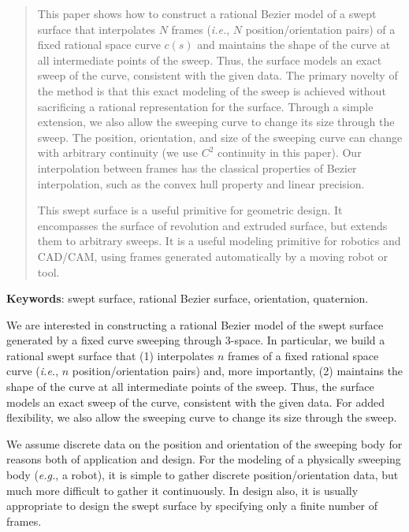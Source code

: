 \maketitle
\thispagestyle{empty}
\begin{abstract}
This paper shows how to construct a rational Bezier model of a swept
surface that interpolates
$N$ frames ({\em i.e.}, $N$ position/orientation pairs)
of a fixed rational space curve $c(s)$ 
and maintains the shape of the curve at all intermediate points 
of the sweep.
Thus, the surface models
an exact sweep of the curve, consistent with the given data.
The primary novelty of the method is that 
this exact modeling of the sweep is achieved
without sacrificing a rational representation for the surface.
Through a simple extension, we also allow the sweeping curve to change
its size through the sweep.
The position, orientation, and size of the sweeping curve can change with
arbitrary continuity (we use $C^2$ continuity in this paper).
Our interpolation between frames has the classical properties
of Bezier interpolation, such as the convex hull property and linear precision.

This swept surface is a useful primitive for geometric design.
It encompasses the surface of revolution and extruded surface, but extends
them to arbitrary sweeps.
It is a useful modeling primitive for robotics and CAD/CAM, using frames generated
automatically by a moving robot or tool.
\end{abstract}

{\bf Keywords}: swept surface, rational Bezier surface, orientation, quaternion.

\clearpage

We are interested in constructing a rational Bezier model of the swept
surface generated by a fixed curve sweeping through 3-space.
In particular, we build a rational swept surface that
(1) interpolates $n$ frames of a fixed rational space curve 
({\em i.e.}, $n$ position/orientation pairs) 
and, more importantly, 
(2) maintains the shape of the curve at all intermediate points of the sweep.
Thus, the surface models 
an exact sweep of the curve, consistent with the given data.
For added flexibility, we also allow the sweeping curve to change its
size through the sweep.

We assume discrete data on the position and orientation
of the sweeping body for reasons both of application and design.
For the modeling of a physically sweeping body ({\em e.g.}, a robot), 
it is simple to gather discrete position/orientation data, 
but much more difficult to gather it continuously.
In design also, it is usually appropriate to design the swept surface
by specifying only a finite number of frames.

